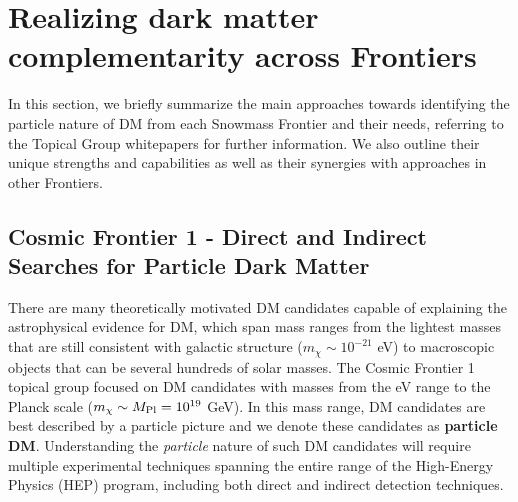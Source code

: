 \documentclass[nofootinbib]{article}
\begin{document}


\section{Realizing dark matter complementarity across Frontiers}
\label{sec:IndividualTGComplementarityNeeds}

In this section, we briefly summarize the main approaches towards identifying the particle nature of DM from each Snowmass Frontier and their needs, referring to the Topical Group whitepapers for further information. We also outline their unique strengths and capabilities as well as their synergies with approaches in other Frontiers. 


\subsection{Cosmic Frontier 1 - Direct and Indirect Searches for Particle Dark Matter}

There are many theoretically motivated DM candidates capable of explaining the astrophysical evidence for DM, which span mass ranges from the lightest masses that are still consistent with galactic structure ($m_\chi\sim 10^{-21}$ eV) to macroscopic objects that can be several hundreds of solar masses. The Cosmic Frontier 1 topical group focused on DM candidates with masses from the eV range to the Planck scale ($m_\chi\sim M_{\rm Pl}=10^{19}$ GeV).
In this mass range, DM candidates are best described by a particle picture and we denote these candidates as {\bf particle DM}. Understanding the {\it particle} nature of such DM candidates will require multiple experimental techniques spanning the entire range of the High-Energy Physics (HEP) program, including both direct and indirect detection techniques. 

\end{document}

